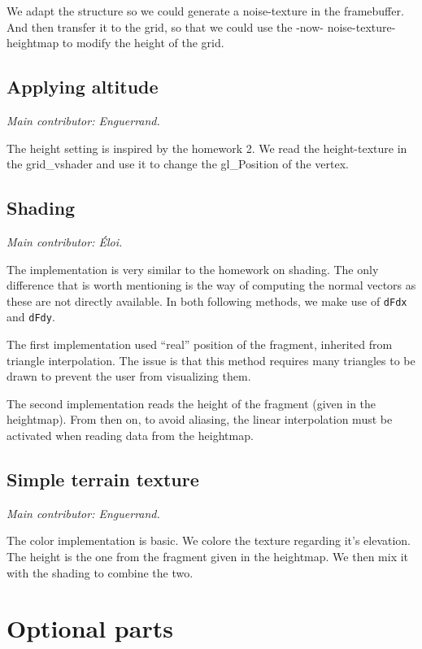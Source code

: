 \documentclass[12pt]{article}
\begin{document}
We adapt the structure so we could generate a noise-texture in the framebuffer. And then transfer it to the grid, so that we could use the -now- noise-texture-heightmap to modify  the height of the grid.

\subsection{Applying altitude}

{\it Main contributor: Enguerrand.}

The height setting is inspired by the homework 2. We read the height-texture in the grid\_vshader and use it to change the gl\_Position of the vertex.

\subsection{Shading}

{\it Main contributor: Éloi.}

The implementation is very similar to the homework on shading. The only difference that is worth mentioning is the way of computing the normal vectors as these are not directly available. In both following methods, we make use of \texttt{dFdx} and \texttt{dFdy}.

The first implementation used ``real'' position of the fragment, inherited from triangle interpolation. The issue is that this method requires many triangles to be drawn to prevent the user from visualizing them.

The second implementation reads the height of the fragment (given in the heightmap). From then on, to avoid aliasing, the linear interpolation must be activated when reading data from the heightmap.

\subsection{Simple terrain texture}

{\it Main contributor: Enguerrand.}

The color implementation is basic. We colore the texture regarding it's elevation. The height is the one from the fragment given in the heightmap. We then mix it with the shading to combine the two.


\section{Optional parts}
\end{document}
